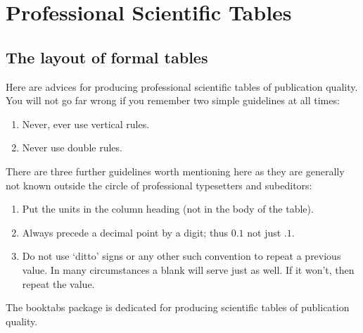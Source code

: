 \documentclass[a4paper,oneside]{book}
\newcommand{\sq}[1]{`#1'}
\newcommand{\package}[1]{\textsf{#1}}
\begin{document}
\chapter{Professional Scientific Tables}
\section{The layout of formal tables}
Here are advices for producing professional scientific tables of publication quality. You will not go far wrong if you remember two simple guidelines at all times:
\begin{enumerate}
  \item Never, ever use vertical rules.
  \item Never use double rules.
\end{enumerate}

There are three further guidelines worth mentioning here as they are generally not known outside the circle of professional typesetters and subeditors:
\begin{enumerate}[resume]
  \item Put the units in the column heading (not in the body of the table).
  \item Always precede a decimal point by a digit; thus $0.1$ not just $.1$.
  \item Do not use \sq{ditto} signs or any other such convention to repeat a previous value. In many circumstances a blank will serve just as well. If it won’t, then repeat the value.
\end{enumerate}

The \package{booktabs} package is dedicated for producing scientific tables of publication quality.
\end{document}
